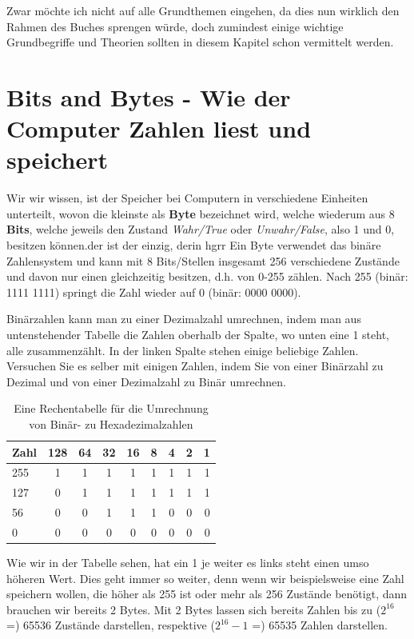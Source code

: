 \documentclass[b5paper,10pt,dvips,fleqn,titlepage,twoside]{book}
\begin{document}
Zwar möchte ich nicht auf alle Grundthemen eingehen, da dies nun wirklich den Rahmen des Buches sprengen würde, doch zumindest einige wichtige Grundbegriffe und Theorien sollten in diesem Kapitel schon vermittelt werden.\newline
\newpage
\section{Bits and Bytes - Wie der Computer Zahlen liest und speichert}
Wir wir wissen, ist der Speicher bei Computern in verschiedene Einheiten unterteilt, wovon die kleinste als \textbf{Byte} bezeichnet wird, welche wiederum aus 8 \textbf{Bits}, welche jeweils den Zustand \emph{Wahr/True} oder \emph{Unwahr/False}, also 1 und 0, besitzen können.der ist der einzig, derin  hgrr
Ein Byte verwendet das binäre Zahlensystem und kann mit 8 Bits/Stellen insgesamt 256 verschiedene Zustände und davon nur einen gleichzeitig  besitzen, d.h. von 0-255 zählen. Nach 255 (binär: 1111 1111) springt die Zahl wieder auf 0 (binär: 0000 0000).

Binärzahlen kann man zu einer Dezimalzahl umrechnen, indem man aus untenstehender Tabelle die Zahlen oberhalb der Spalte, wo unten eine 1 steht, alle zusammenzählt. In der linken Spalte stehen einige beliebige Zahlen. Versuchen Sie es selber mit einigen Zahlen, indem Sie von einer Binärzahl zu Dezimal und von einer Dezimalzahl zu Binär umrechnen.


\begin{table}[h]
\caption{Eine Rechentabelle für die Umrechnung von Binär- zu Hexadezimalzahlen}
\begin{tabular}{|l|c|c|c|c|c|c|c|r|}\hline
Zahl & 128 & 64 & 32 & 16 & 8 & 4 & 2 & 1 \\\hline\hline
255 & 1 & 1 & 1 & 1 & 1 & 1 & 1 & 1\\\hline
127 & 0 & 1 & 1 & 1 & 1 & 1 & 1 & 1\\\hline
56 & 0 & 0 & 1 & 1 & 1 & 0 & 0 & 0\\\hline
0 & 0 & 0 & 0 & 0 & 0 & 0 & 0 & 0\\\hline
\end{tabular}
\end{table}

Wie wir in der Tabelle sehen, hat ein 1 je weiter es links steht einen umso höheren Wert. Dies geht immer so weiter, denn wenn wir beispielsweise eine Zahl speichern wollen, die höher als 255 ist oder mehr als 256 Zustände benötigt, dann brauchen wir bereits 2 Bytes. Mit 2 Bytes lassen sich bereits Zahlen \newline bis zu  ($2^{16}$ =)  65536 Zustände darstellen, respektive ($2^{16}-1$ =) 65535 Zahlen darstellen.
\end{document}
